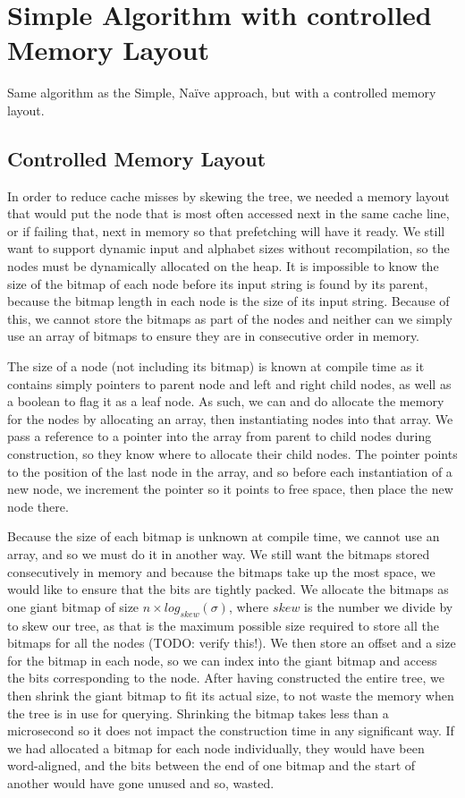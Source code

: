 \section{Simple Algorithm with controlled Memory Layout}
Same algorithm as the Simple, Naïve approach, but with a controlled memory layout.

\subsection{Controlled Memory Layout}
In order to reduce cache misses by skewing the tree, we needed a memory layout that would put the node that is most often accessed next in the same cache line, or if failing that, next in memory so that prefetching will have it ready.
We still want to support dynamic input and alphabet sizes without recompilation, so the nodes must be dynamically allocated on the heap.
It is impossible to know the size of the bitmap of each node before its input string is found by its parent, because the bitmap length in each node is the size of its input string.
Because of this, we cannot store the bitmaps as part of the nodes and neither can we simply use an array of bitmaps to ensure they are in consecutive order in memory.

The size of a node (not including its bitmap) is known at compile time as it contains simply pointers to parent node and left and right child nodes, as well as a boolean to flag it as a leaf node.
As such, we can and do allocate the memory for the nodes by allocating an array, then instantiating nodes into that array.
We pass a reference to a pointer into the array from parent to child nodes during construction, so they know where to allocate their child nodes.
The pointer points to the position of the last node in the array, and so before each instantiation of a new node, we increment the pointer so it points to free space, then place the new node there.

Because the size of each bitmap is unknown at compile time, we cannot use an array, and so we must do it in another way. We still want the bitmaps stored consecutively in memory and because the bitmaps take up the most space, we would like to ensure that the bits are tightly packed.
We allocate the bitmaps as one giant bitmap of size $n \times log_{skew}(\sigma)$, where $skew$ is the number we divide by to skew our tree, as that is the maximum possible size required to store all the bitmaps for all the nodes (TODO: verify this!). We then store an offset and a size for the bitmap in each node, so we can index into the giant bitmap and access the bits corresponding to the node.
After having constructed the entire tree, we then shrink the giant bitmap to fit its actual size, to not waste the memory when the tree is in use for querying. Shrinking the bitmap takes less than a microsecond so it does not impact the construction time in any significant way.
If we had allocated a bitmap for each node individually, they would have been word-aligned, and the bits between the end of one bitmap and the start of another would have gone unused and so, wasted.

